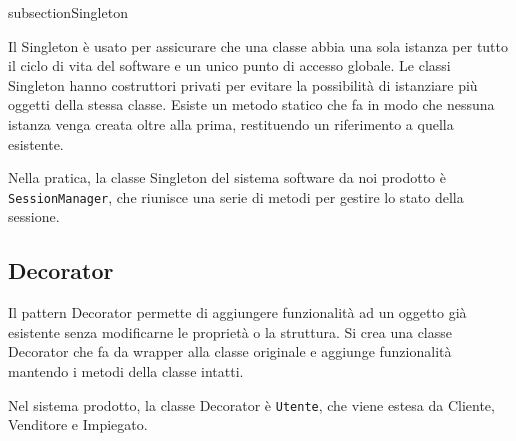 \documentclass[openany, 12pt]{report}
\begin{document}
subsection{Singleton}

Il Singleton \`e usato per assicurare che una classe abbia una sola istanza per tutto il ciclo di vita del software e un unico punto di accesso globale. Le classi Singleton hanno costruttori privati per evitare la possibilit\`a di istanziare pi\`u oggetti della stessa classe. Esiste un metodo statico che fa in modo che nessuna istanza venga creata oltre alla prima, restituendo un riferimento a quella esistente.

Nella pratica, la classe Singleton del sistema software da noi prodotto \`e \texttt{SessionManager}, che riunisce una serie di metodi per gestire lo stato della sessione.  


\subsection{Decorator}

Il pattern Decorator permette di aggiungere funzionalit\`a ad un oggetto gi\`a esistente senza modificarne le propriet\`a o la struttura. Si crea una classe Decorator che fa da wrapper alla classe originale e aggiunge funzionalit\`a mantendo i metodi della classe intatti.

Nel sistema prodotto, la classe Decorator \`e \texttt{Utente}, che viene estesa da Cliente, Venditore e Impiegato. 
\end{document}
